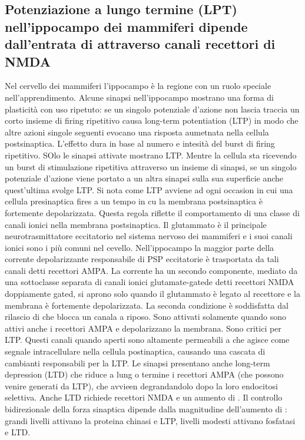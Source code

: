 \subsection{Potenziazione a lungo termine (LPT) nell'ippocampo dei mammiferi dipende dall'entrata di  attraverso canali recettori di NMDA}
Nel cervello dei mammiferi l'ippocampo \`e la regione con un ruolo speciale nell'apprendimento. Alcune sinapsi nell'ippocampo mostrano una forma di plasticit\`a con uso ripetuto: se
un singolo potenziale d'azione non lascia traccia un corto insieme di firing ripetitivo causa long-term potentiation (LTP) in modo che altre azioni singole seguenti evocano una
risposta aumetnata nella cellula postsinaptica. L'effetto dura in base al numero e intesit\`a del burst di firing ripetitivo. SOlo le sinapsi attivate mostrano LTP. Mentre la cellula
sta ricevendo un burst di stimulazione ripetitiva attraverso un insieme di sinapsi, se un singolo potenziale d'azione viene portato a un altra sinapsi sulla sua superficie anche 
quest'ultima svolge LTP. Si nota come LTP avviene ad ogni occasion in cui una cellula presinaptica fires a un tempo in cu la membrana postsinaptica \`e fortemente depolarizzata. 
Questa regola riflette il comportamento di una classe di canali ionici nella membrana postsinaptica. Il glutammato \`e il principale neurotrasmittatore eccitatorio nel sistema nervoso
dei mammiferi e i suoi canali ionici sono i pi\`u comuni nel cevello. Nell'ippocampo la maggior parte della corrente depolarizzante responsabile di PSP eccitatorie \`e trasportata
da tali canali detti recettori AMPA. La corrente ha un secondo componente, mediato da una sottoclasse separata di canali ionici glutamate-gatede detti recettori NMDA doppiamente gated,
si aprono solo quando il glutammato \`e legato al recettore e la membrana \`e fortemente depolarizzata. La seconda condizione \`e soddisfatta dal rilascio di  che blocca 
un canala a riposo. Sono attivati solamente quando sono attivi anche i recettori AMPA e depolarizzano la membrana. Sono critici per LTP. Questi canali quando aperti sono
altamente permeabili a  che agisce come segnale intracellulare nella cellula postinaptica, causando una cascata di cambianti responsabili per la LTP. Le sinapsi presentano
anche long-term depression (LTD) che riduce a lung o termine i recettori AMPA (che possono venire generati da LTP), che avvieen degrandandolo dopo la loro endocitosi selettiva. 
Anche LTD richiede recettori NMDA e un aumento di . Il controllo bidirezionale della forza sinaptica dipende dalla magnitudine dell'aumento di : grandi livelli
attivano la proteina chinasi e LTP, livelli modesti attivano fosfatasi e LTD. 
